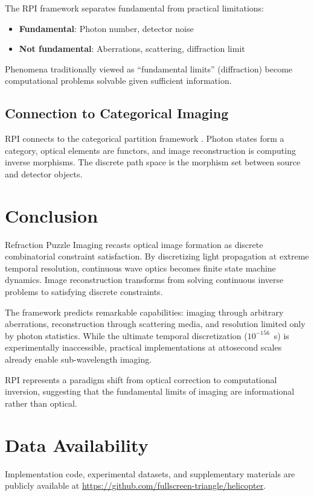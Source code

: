 \documentclass[twocolumn,10pt,a4paper]{article}
\begin{document}
The RPI framework separates fundamental from practical limitations:
\begin{itemize}
    \item \textbf{Fundamental}: Photon number, detector noise
    \item \textbf{Not fundamental}: Aberrations, scattering, diffraction limit
\end{itemize}

Phenomena traditionally viewed as ``fundamental limits'' (diffraction) become computational problems solvable given sufficient information.

\subsection{Connection to Categorical Imaging}

RPI connects to the categorical partition framework \cite{partition2024}. Photon states form a category, optical elements are functors, and image reconstruction is computing inverse morphisms. The discrete path space is the morphism set between source and detector objects.

\section{Conclusion}

Refraction Puzzle Imaging recasts optical image formation as discrete combinatorial constraint satisfaction. By discretizing light propagation at extreme temporal resolution, continuous wave optics becomes finite state machine dynamics. Image reconstruction transforms from solving continuous inverse problems to satisfying discrete constraints.

The framework predicts remarkable capabilities: imaging through arbitrary aberrations, reconstruction through scattering media, and resolution limited only by photon statistics. While the ultimate temporal discretization ($10^{-156}$~s) is experimentally inaccessible, practical implementations at attosecond scales already enable sub-wavelength imaging.

RPI represents a paradigm shift from optical correction to computational inversion, suggesting that the fundamental limits of imaging are informational rather than optical.

\section*{Data Availability}

Implementation code, experimental datasets, and supplementary materials are publicly available at \url{https://github.com/fullscreen-triangle/helicopter}.




\end{document}
